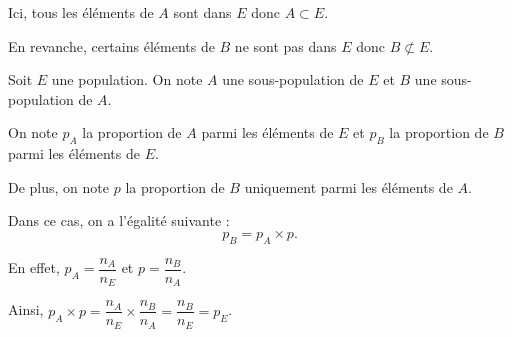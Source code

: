 \documentclass[10pt,openright,twoside,french]{book}
\begin{document}
\begin{center}
Ici, tous les éléments de $A$ sont dans $E$ donc $A \subset E$.\par En revanche, certains éléments de $B$ ne sont pas dans $E$ donc $B \not\subset E$.\medskip

\end{center}

\begin{Prop}
    Soit $E$ une population. On note $A$ une sous-population de $E$ et $B$ une sous-population de $A$.\medskip
    
\begin{center}
\end{center}
On note $p_A$ la proportion de $A$ parmi les éléments de $E$ et $p_B$ la proportion de $B$ parmi les éléments de $E$.\par
De plus, on note $p$ la proportion de $B$ uniquement parmi les éléments de $A$.\par
Dans ce cas, on a l'égalité suivante :
\[p_B = p_A \times p.\]
\end{Prop}

\begin{Demo}
    En effet, $p_A = \dfrac{n_A}{n_E}$ et $p = \dfrac{n_B}{n_A}$.\par\medskip
    Ainsi, $p_A \times p = \dfrac{n_A}{n_E} \times \dfrac{n_B}{n_A} = \dfrac{n_B}{n_E} = p_E$.
\end{Demo}
\end{document}
